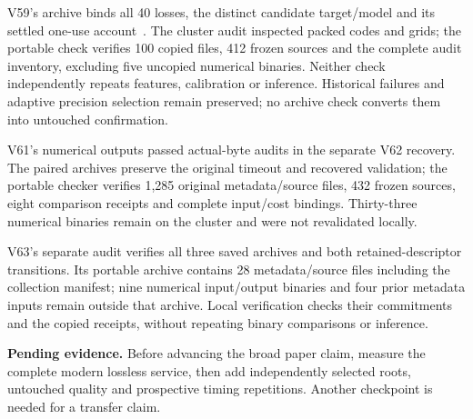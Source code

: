 \documentclass[10pt,twocolumn,letterpaper]{article}
\newcommand{\pending}[1]{\par\noindent\textbf{Pending evidence.} #1\par}
\begin{document}
V59's archive binds all 40 losses, the distinct candidate target/model and its
settled one-use account~\cite{v59terminal}. The cluster audit inspected packed
codes and grids; the portable check verifies 100 copied files, 412 frozen sources
and the complete audit inventory, excluding five uncopied numerical binaries.
Neither check independently repeats features, calibration or inference.
Historical failures and adaptive precision selection remain preserved; no archive
check converts them into untouched confirmation.

V61's numerical outputs passed actual-byte audits in the separate V62 recovery.
The paired archives preserve the original timeout and recovered validation;
the portable checker verifies 1,285 original metadata/source files, 432 frozen
sources, eight comparison receipts and complete input/cost bindings. Thirty-three
numerical binaries remain on the cluster and were not revalidated locally.

V63's separate audit verifies all three saved archives and both retained-descriptor
transitions. Its portable archive contains 28 metadata/source files including the
collection manifest; nine numerical input/output binaries and four prior metadata
inputs remain outside that archive. Local verification checks their commitments
and the copied receipts, without repeating binary comparisons or inference.

\pending{Before advancing the broad paper claim, measure the complete modern
lossless service, then add independently selected roots, untouched quality and
prospective timing repetitions. Another checkpoint is needed for a transfer claim.}
\end{document}
